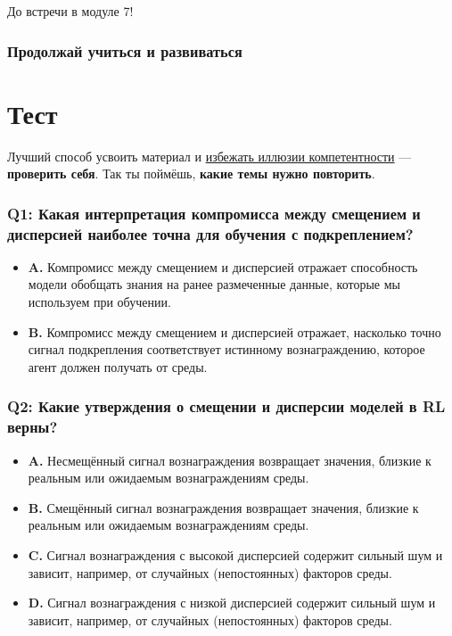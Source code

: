 \documentclass[11pt,a4paper]{article}
\begin{document}
До встречи в модуле 7!

\subsubsection{Продолжай учиться и развиваться}\label{keep-learning-stay-awesome}

\section{Тест}\label{quiz}

Лучший способ усвоить материал и \href{https://www.coursera.org/lecture/learning-how-to-learn/illusions-of-competence-BuFzf}{избежать иллюзии компетентности} --- \textbf{проверить себя}. Так ты поймёшь, \textbf{какие темы нужно повторить}.

\subsubsection{Q1: Какая интерпретация компромисса между смещением и дисперсией наиболее точна для обучения с подкреплением?}\label{q1-which-of-the-following-interpretations-of-bias-variance-tradeoff-is-the-most-accurate-in-the-field-of-reinforcement-learning}

\begin{itemize}
\tightlist
\item
  \textbf{A.} Компромисс между смещением и дисперсией отражает способность модели обобщать знания на ранее размеченные данные, которые мы используем при обучении.
\item
  \textbf{B.} Компромисс между смещением и дисперсией отражает, насколько точно сигнал подкрепления соответствует истинному вознаграждению, которое агент должен получать от среды.
\end{itemize}

\subsubsection{Q2: Какие утверждения о смещении и дисперсии моделей в RL верны?}\label{q2-which-of-the-following-statements-are-true-when-talking-about-models-with-bias-andor-variance-in-rl}

\begin{itemize}
\tightlist
\item
  \textbf{A.} Несмещённый сигнал вознаграждения возвращает значения, близкие к реальным или ожидаемым вознаграждениям среды.
\item
  \textbf{B.} Смещённый сигнал вознаграждения возвращает значения, близкие к реальным или ожидаемым вознаграждениям среды.
\item
  \textbf{C.} Сигнал вознаграждения с высокой дисперсией содержит сильный шум и зависит, например, от случайных (непостоянных) факторов среды.
\item
  \textbf{D.} Сигнал вознаграждения с низкой дисперсией содержит сильный шум и зависит, например, от случайных (непостоянных) факторов среды.
\end{itemize}
\end{document}
